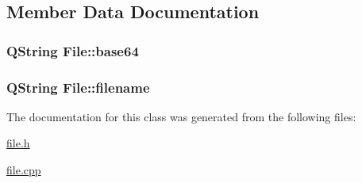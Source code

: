 \subsection{Member Data Documentation}
\subsubsection[{\texorpdfstring{base64}{base64}}]{\setlength{\rightskip}{0pt plus 5cm}Q\+String File\+::base64\hspace{0.3cm}{\ttfamily [private]}}\hypertarget{classFile_a84fadb8b406869284dc6fd09c9de36a2}{}\label{classFile_a84fadb8b406869284dc6fd09c9de36a2}
\subsubsection[{\texorpdfstring{filename}{filename}}]{\setlength{\rightskip}{0pt plus 5cm}Q\+String File\+::filename\hspace{0.3cm}{\ttfamily [private]}}\hypertarget{classFile_aa57d3c49fb1dd72a1df15c1033a9c0a4}{}\label{classFile_aa57d3c49fb1dd72a1df15c1033a9c0a4}


The documentation for this class was generated from the following files\+:\begin{DoxyCompactItemize}
\item 
\hyperlink{file_8h}{file.\+h}\item 
\hyperlink{file_8cpp}{file.\+cpp}\end{DoxyCompactItemize}

